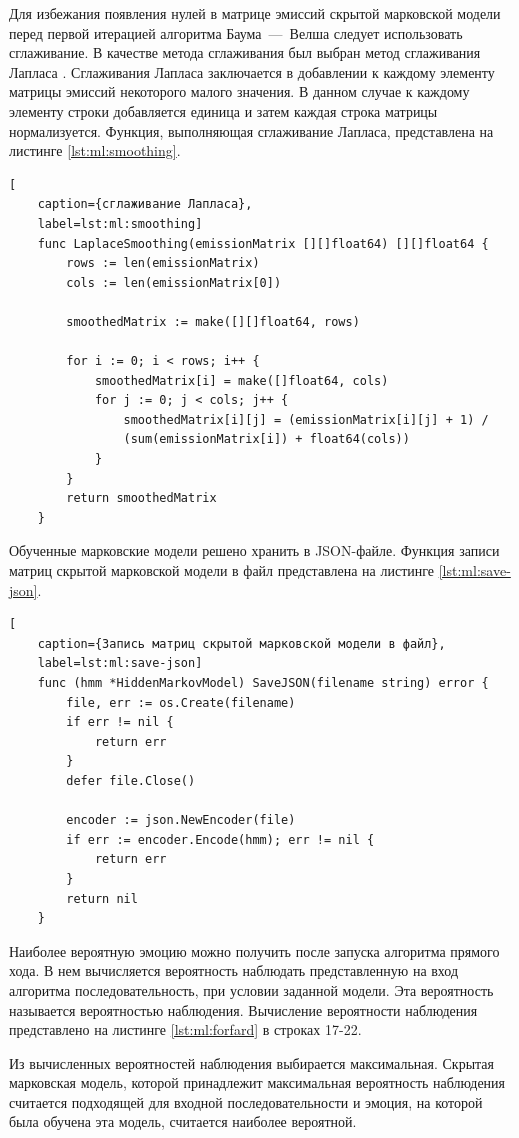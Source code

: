Для избежания появления нулей в матрице эмиссий скрытой марковской модели перед первой итерацией алгоритма Баума~---~Велша следует использовать сглаживание. В качестве метода сглаживания был выбран метод сглаживания Лапласа \cite{smooting}.
%
Сглаживания Лапласа заключается в добавлении к каждому элементу матрицы эмиссий некоторого малого значения. В данном случае к каждому элементу строки добавляется единица и затем каждая строка матрицы нормализуется. Функция, выполняющая сглаживание Лапласа, представлена на листинге \ref{lst:ml:smoothing}.
\begin{lstlisting}[
	caption={сглаживание Лапласа},
	label=lst:ml:smoothing]
	func LaplaceSmoothing(emissionMatrix [][]float64) [][]float64 {
		rows := len(emissionMatrix)
		cols := len(emissionMatrix[0])
		
		smoothedMatrix := make([][]float64, rows)
		
		for i := 0; i < rows; i++ {
			smoothedMatrix[i] = make([]float64, cols)
			for j := 0; j < cols; j++ {
				smoothedMatrix[i][j] = (emissionMatrix[i][j] + 1) /
				(sum(emissionMatrix[i]) + float64(cols))
			}
		}
		return smoothedMatrix
	}
\end{lstlisting}
Обученные марковские модели решено хранить в JSON-файле. Функция записи матриц скрытой марковской модели в файл представлена на листинге \ref{lst:ml:save-json}.
\begin{lstlisting}[
	caption={Запись матриц скрытой марковской модели в файл},
	label=lst:ml:save-json]
	func (hmm *HiddenMarkovModel) SaveJSON(filename string) error {
		file, err := os.Create(filename)
		if err != nil {
			return err
		}
		defer file.Close()
		
		encoder := json.NewEncoder(file)
		if err := encoder.Encode(hmm); err != nil {
			return err
		}
		return nil
	}
\end{lstlisting}

Наиболее вероятную эмоцию можно получить после запуска алгоритма прямого хода. В нем вычисляется вероятность наблюдать представленную на вход алгоритма последовательность, при условии заданной модели. Эта вероятность называется вероятностью наблюдения. Вычисление вероятности наблюдения представлено на листинге \ref{lst:ml:forfard} в строках 17-22.

Из вычисленных вероятностей наблюдения выбирается максимальная. Скрытая марковская модель, которой принадлежит максимальная вероятность наблюдения считается подходящей для входной последовательности и эмоция, на которой была обучена эта модель, считается наиболее вероятной.

